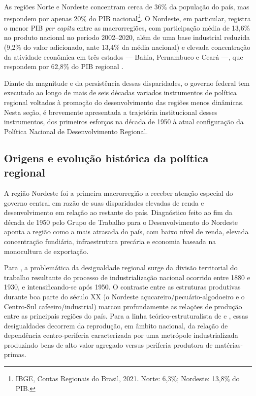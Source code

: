 

As regiões Norte e Nordeste concentram cerca de 36\% da população do país, mas respondem por apenas 20\% do PIB nacional\footnote{IBGE, Contas Regionais do Brasil, 2021. Norte: 6,3\%; Nordeste: 13,8\% do PIB.}. O Nordeste, em particular, registra o menor PIB \textit{per capita} entre as macrorregiões, com participação média de 13,6\% no produto nacional no período 2002--2020, além de uma base industrial reduzida (9,2\% do valor adicionado, ante 13,4\% da média nacional) e elevada concentração da atividade econômica em três estados --- Bahia, Pernambuco e Ceará ---, que respondem por 62,8\% do PIB regional \cite{Trece2023}.

Diante da magnitude e da persistência dessas disparidades, o governo federal  tem executado ao longo de mais de seis décadas variados instrumentos de política regional voltados à promoção do desenvolvimento das regiões menos dinâmicas. Nesta seção, é brevemente apresentada a trajetória institucional desses instrumentos, dos primeiros esforços na década de 1950 à atual configuração da Política Nacional de Desenvolvimento Regional.

\subsection{Origens e evolução histórica da política regional}
\label{subsec:origens-evolucao}

A região Nordeste foi a primeira macrorregião a receber atenção especial do governo central em razão de suas disparidades elevadas de renda e desenvolvimento em relação ao restante do país. Diagnóstico feito ao fim da década de 1950 pelo Grupo de Trabalho para o Desenvolvimento do Nordeste~\cite{GTDN1959} aponta a região como a mais atrasada do país, com baixo nível de renda, elevada concentração fundiária, infraestrutura precária e economia baseada na monocultura de exportação.

Para , a problemática da desigualdade regional surge da divisão territorial do trabalho resultante do processo de industrialização nacional ocorrido entre 1880 e 1930, e intensificando-se após 1950. O contraste entre as estruturas produtivas durante boa parte do século XX (o Nordeste açucareiro/pecuário-algodoeiro e o Centro-Sul cafeeiro/industrial) marcou profundamente as relações de produção entre as principais regiões do país. Para a linha teórico-estruturalista de  e , essas desigualdades decorrem da reprodução, em âmbito nacional, da relação de dependência centro-periferia caracterizada por uma metrópole industrializada produzindo bens de alto valor agregado versus periferia produtora de matérias-primas.

